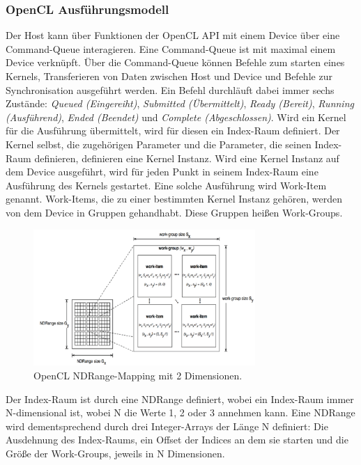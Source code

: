 \subsubsection*{OpenCL Ausführungsmodell}
Der Host kann über Funktionen der OpenCL API mit einem Device über eine Command-Queue interagieren.
Eine Command-Queue ist mit maximal einem Device verknüpft.
Über die Command-Queue können Befehle zum starten eines Kernels, Transferieren von Daten zwischen Host und Device und Befehle zur Synchronisation ausgeführt werden.
Ein Befehl durchläuft dabei immer sechs Zustände: \emph{Queued (Eingereiht)}, \emph{Submitted (Übermittelt)}, \emph{Ready (Bereit)}, \emph{Running (Ausführend)}, \emph{Ended (Beendet)} und \emph{Complete (Abgeschlossen)}.
Wird ein Kernel für die Ausführung übermittelt, wird für diesen ein Index-Raum definiert.
Der Kernel selbst, die zugehörigen Parameter und die Parameter, die seinen Index-Raum definieren, definieren eine Kernel Instanz.
Wird eine Kernel Instanz auf dem Device ausgeführt, wird für jeden Punkt in seinem Index-Raum eine Ausführung des Kernels gestartet.
Eine solche Ausführung wird Work-Item genannt.
Work-Items, die zu einer bestimmten Kernel Instanz gehören, werden von dem Device in Gruppen gehandhabt.
Diese Gruppen heißen Work-Groups.

\begin{figure}
	\centering
	\includegraphics[width=0.75\textwidth]{../../Grafiken/OpenCL-NDRange-Mapping.png}
	\caption{OpenCL NDRange-Mapping mit 2 Dimensionen. \cite{OCLSPC}}
	\label{fig::ga03}
\end{figure} 
Der Index-Raum ist durch eine NDRange definiert, wobei ein Index-Raum immer N-dimensional ist, wobei N die Werte 1, 2 oder 3 annehmen kann.
Eine NDRange wird dementsprechend durch drei Integer-Arrays der Länge N definiert: Die Ausdehnung des Index-Raums, ein Offset der Indices an dem sie starten und die Größe der Work-Groups, jeweils in N Dimensionen.

